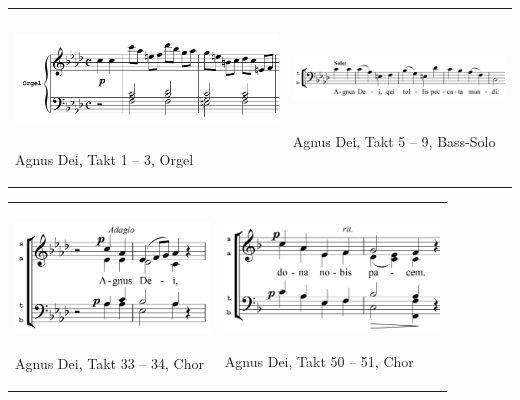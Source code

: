 \begin{flushleft}
\tablefirsthead{}
\tablehead{}
\tabletail{}
\tablelasttail{}
\begin{supertabular}{m{7.676cm}m{6.372cm}}

\includegraphics[width=7.493cm,height=2.828cm]{pictures/zulassungsarbeit-img115.png}

Agnus Dei, Takt 1 – 3, Orgel &

\includegraphics[width=6.018cm,height=1.85cm]{pictures/zulassungsarbeit-img116.png}

Agnus Dei, Takt 5 – 9, Bass-Solo\\
\end{supertabular}
\end{flushleft}
\begin{flushleft}
\tablefirsthead{}
\tablehead{}
\tabletail{}
\tablelasttail{}
\begin{supertabular}{m{5.3650002cm}m{5.875cm}}

\includegraphics[width=5.182cm,height=3.087cm]{pictures/zulassungsarbeit-img117.png}

Agnus Dei, Takt 33 – 34, Chor &

\includegraphics[width=5.692cm,height=2.972cm]{pictures/zulassungsarbeit-img118.png}

Agnus Dei, Takt 50 – 51, Chor\\
\end{supertabular}
\end{flushleft}
